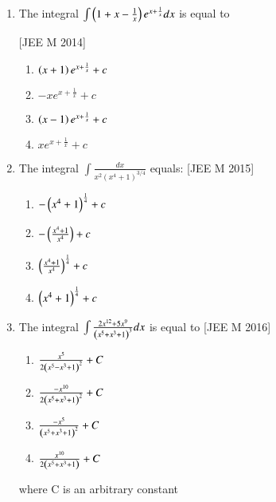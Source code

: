 \documentclass[journal,12pt,twocolumn]{IEEEtran}
\theoremstyle{remark}
\begin{document}
\begin{enumerate}[label=\textcolor{black}{\arabic*.}]
		(d) $\frac{1}{3}[x^3\psi\brak{x^3}-\int x^3\psi(x^3)dx] + C$

	\item The integral $\int\left(1+x-\frac{1}{x}\right)e^{x+\frac{1}{x}}dx$ is equal to

		\hfill{[JEE M 2014]}

		\begin{multicols}{2}
			\begin{enumerate}[label=(\alph*)]
				\item $\left(x+1\right)e^{x+\frac{1}{x}}+c$
				\item $-xe^{x+\frac{1}{x}}+c$
				\item $\left(x-1\right)e^{x+\frac{1}{x}}+c$
				\item $xe^{x+\frac{1}{x}}+c$
			\end{enumerate}
		\end{multicols}

	\item The integral $\int\frac{dx}{x^2(x^4+1)^{3/4}}$ equals:
		\hfill{[JEE M 2015]}

		\begin{multicols}{2}
			\begin{enumerate}[label=(\alph*)]
				\item $-\left(x^4+1\right)^{\frac{1}{4}}+c$
				\item $-\left(\frac{x^4+1}{x^4}\right)+c$
				\item $\left(\frac{x^4+1}{x^4}\right)^{\frac{1}{4}}+c$
				\item $\left(x^4+1\right)^{\frac{1}{4}}+c$
			\end{enumerate}
		\end{multicols}

	\item The integral $\int\frac{2x^{12}+5x^9}{\left(x^5+x^3+1\right)^3}dx$ is equal to
		\hfill{[JEE M 2016]}

		\begin{multicols}{2}
			\begin{enumerate}[label=(\alph*)]
				\item $\frac{x^5}{2\left(x^5-x^3+1\right)^2}+C$
				\item $\frac{-x^{10}}{2\left(x^5+x^3+1\right)^2}+C$
				\item $\frac{-x^5}{\left(x^5+x^3+1\right)^2}+C$
				\item $\frac{x^{10}}{2\left(x^5+x^3+1\right)}+C$
			\end{enumerate}
		\end{multicols}
		where C is an arbitrary constant


\end{enumerate}
\end{document}
